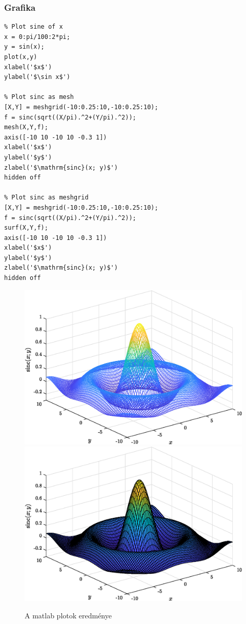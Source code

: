 \documentclass[../../main.tex]{subfiles}
\begin{document}
\subsubsection*{Grafika}
\begin{verbatim}
% Plot sine of x
x = 0:pi/100:2*pi;
y = sin(x);
plot(x,y)
xlabel('$x$')
ylabel('$\sin x$')

% Plot sinc as mesh
[X,Y] = meshgrid(-10:0.25:10,-10:0.25:10);
f = sinc(sqrt((X/pi).^2+(Y/pi).^2));
mesh(X,Y,f);
axis([-10 10 -10 10 -0.3 1])
xlabel('$x$')
ylabel('$y$')
zlabel('$\mathrm{sinc}(x; y)$')
hidden off

% Plot sinc as meshgrid
[X,Y] = meshgrid(-10:0.25:10,-10:0.25:10);
f = sinc(sqrt((X/pi).^2+(Y/pi).^2));
surf(X,Y,f);
axis([-10 10 -10 10 -0.3 1])
xlabel('$x$')
ylabel('$y$')
zlabel('$\mathrm{sinc}(x; y)$')
hidden off
\end{verbatim}

\begin{figure}[H]
  \centering
  \includegraphics[width=.45\textwidth]{../../static/matlab-ex2}
  \hfill
  \includegraphics[width=.45\textwidth]{../../static/matlab-ex3}
  \caption{A matlab plotok eredménye}
  \label{fig:matlab}
\end{figure}
\end{document}
